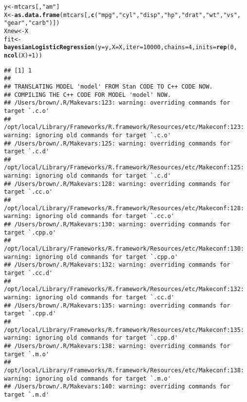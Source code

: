 \documentclass{article}\usepackage[]{graphicx}\usepackage[]{color}
\makeatletter
\newcommand{\hlnum}[1]{\textcolor[rgb]{0.686,0.059,0.569}{#1}}%
\newcommand{\hlstr}[1]{\textcolor[rgb]{0.192,0.494,0.8}{#1}}%
\newcommand{\hlopt}[1]{\textcolor[rgb]{0,0,0}{#1}}%
\newcommand{\hlstd}[1]{\textcolor[rgb]{0.345,0.345,0.345}{#1}}%
\newcommand{\hlkwb}[1]{\textcolor[rgb]{0.69,0.353,0.396}{#1}}%
\newcommand{\hlkwc}[1]{\textcolor[rgb]{0.333,0.667,0.333}{#1}}%
\newcommand{\hlkwd}[1]{\textcolor[rgb]{0.737,0.353,0.396}{\textbf{#1}}}%
\newenvironment{kframe}{%
 \def\at@end@of@kframe{}%
 \ifinner\ifhmode%
  \def\at@end@of@kframe{\end{minipage}}%
  \begin{minipage}{\columnwidth}%
 \fi\fi%
 \def\FrameCommand##1{\hskip\@totalleftmargin \hskip-\fboxsep
 \colorbox{shadecolor}{##1}\hskip-\fboxsep
     \hskip-\linewidth \hskip-\@totalleftmargin \hskip\columnwidth}%
 \MakeFramed {\advance\hsize-\width
   \@totalleftmargin\z@ \linewidth\hsize
   \@setminipage}}%
 {\par\unskip\endMakeFramed%
 \at@end@of@kframe}
\newenvironment{knitrout}{}{} %
\makeatother
\begin{document}
\begin{knitrout}
\color{fgcolor}\begin{kframe}
\begin{alltt}
\hlstd{y} \hlkwb{<-} \hlstd{mtcars[,} \hlstr{"am"}\hlstd{]}
\hlstd{X} \hlkwb{<-} \hlkwd{as.data.frame}\hlstd{(mtcars[,} \hlkwd{c}\hlstd{(}\hlstr{"mpg"}\hlstd{,} \hlstr{"cyl"}\hlstd{,} \hlstr{"disp"}\hlstd{,} \hlstr{"hp"}\hlstd{,} \hlstr{"drat"}\hlstd{,} \hlstr{"wt"}\hlstd{,} \hlstr{"vs"}\hlstd{,}
    \hlstr{"gear"}\hlstd{,} \hlstr{"carb"}\hlstd{)])}
\hlstd{Xnew} \hlkwb{<-} \hlstd{X}
\hlstd{fit} \hlkwb{<-} \hlkwd{bayesianLogisticRegression}\hlstd{(}\hlkwc{y} \hlstd{= y,} \hlkwc{X} \hlstd{= X,} \hlkwc{iter} \hlstd{=} \hlnum{10000}\hlstd{,} \hlkwc{chains} \hlstd{=} \hlnum{4}\hlstd{,} \hlkwc{inits} \hlstd{=} \hlkwd{rep}\hlstd{(}\hlnum{0}\hlstd{,}
    \hlkwd{ncol}\hlstd{(X)} \hlopt{+} \hlnum{1}\hlstd{))}
\end{alltt}
\begin{verbatim}
## [1] 1
## 
## TRANSLATING MODEL 'model' FROM Stan CODE TO C++ CODE NOW.
## COMPILING THE C++ CODE FOR MODEL 'model' NOW.
## /Users/brown/.R/Makevars:123: warning: overriding commands for target `.c.o'
## /opt/local/Library/Frameworks/R.framework/Resources/etc/Makeconf:123: warning: ignoring old commands for target `.c.o'
## /Users/brown/.R/Makevars:125: warning: overriding commands for target `.c.d'
## /opt/local/Library/Frameworks/R.framework/Resources/etc/Makeconf:125: warning: ignoring old commands for target `.c.d'
## /Users/brown/.R/Makevars:128: warning: overriding commands for target `.cc.o'
## /opt/local/Library/Frameworks/R.framework/Resources/etc/Makeconf:128: warning: ignoring old commands for target `.cc.o'
## /Users/brown/.R/Makevars:130: warning: overriding commands for target `.cpp.o'
## /opt/local/Library/Frameworks/R.framework/Resources/etc/Makeconf:130: warning: ignoring old commands for target `.cpp.o'
## /Users/brown/.R/Makevars:132: warning: overriding commands for target `.cc.d'
## /opt/local/Library/Frameworks/R.framework/Resources/etc/Makeconf:132: warning: ignoring old commands for target `.cc.d'
## /Users/brown/.R/Makevars:135: warning: overriding commands for target `.cpp.d'
## /opt/local/Library/Frameworks/R.framework/Resources/etc/Makeconf:135: warning: ignoring old commands for target `.cpp.d'
## /Users/brown/.R/Makevars:138: warning: overriding commands for target `.m.o'
## /opt/local/Library/Frameworks/R.framework/Resources/etc/Makeconf:138: warning: ignoring old commands for target `.m.o'
## /Users/brown/.R/Makevars:140: warning: overriding commands for target `.m.d'

\end{verbatim}
\end{kframe}
\end{knitrout}
\end{document}
